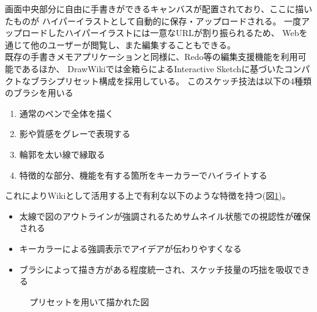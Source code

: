 画面中央部分に自由に手書きができるキャンバスが配置されており、ここに描いたものが
ハイパーイラストとして自動的に保存・アップロードされる。
一度アップロードしたハイパーイラストには一意なURLが割り振られるため、
Webを通じて他のユーザーが閲覧し、また編集することもできる。
\\
既存の手書きメモアプリケーションと同様に、Redo等の編集支援機能を利用可能であるほか、
DrawWikiでは金箱らによるInteractive Sketch\cite{130004638060}に基づいたコンパクトなブラシプリセット構成を採用している。
このスケッチ技法は以下の4種類のブラシを用いる
\begin{enumerate}
    \item 通常のペンで全体を描く
    \item 影や質感をグレーで表現する
    \item 輪郭を太い線で縁取る
    \item 特徴的な部分、機能を有する箇所をキーカラーでハイライトする
\end{enumerate}
これによりWikiとして活用する上で有利な以下のような特徴を持つ(図\ref{fig:interactivesketch})。
\begin{itemize}
    \item 太線で図のアウトラインが強調されるためサムネイル状態での視認性が確保される
    \item キーカラーによる強調表示でアイデアが伝わりやすくなる
    \item ブラシによって描き方がある程度統一され、スケッチ技量の巧拙を吸収できる
\end{itemize}

\begin{figure}[htbp]
    \begin{center}
         \end{center}
    \caption{プリセットを用いて描かれた図}
    \label{fig:interactivesketch}
\end{figure}

